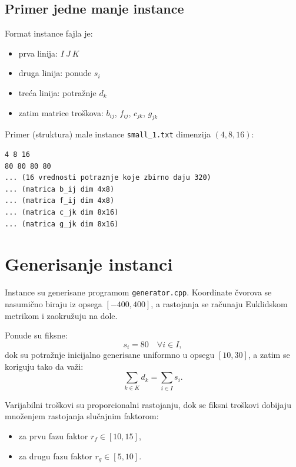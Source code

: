 \documentclass[12pt,a4paper]{article}
\begin{document}
\subsection{Primer jedne manje instance}
Format instance fajla je:
\begin{itemize}
    \item prva linija: $I\ J\ K$
    \item druga linija: ponude $s_i$
    \item treća linija: potražnje $d_k$
    \item zatim matrice troškova: $b_{ij}$, $f_{ij}$, $c_{jk}$, $g_{jk}$
\end{itemize}

Primer (struktura) male instance \texttt{small\_1.txt} dimenzija $(4,8,16)$:
\begin{verbatim}
4 8 16
80 80 80 80
... (16 vrednosti potraznje koje zbirno daju 320)
... (matrica b_ij dim 4x8)
... (matrica f_ij dim 4x8)
... (matrica c_jk dim 8x16)
... (matrica g_jk dim 8x16)
\end{verbatim}

\section{Generisanje instanci}
Instance su generisane programom \texttt{generator.cpp}. Koordinate čvorova se nasumično biraju iz opsega $[-400,400]$,
a rastojanja se računaju Euklidskom metrikom i zaokružuju na dole.

Ponude su fiksne:
\[
s_i = 80 \quad \forall i \in I,
\]
dok su potražnje inicijalno generisane uniformno u opsegu $[10,30]$, a zatim se koriguju tako da važi:
\[
\sum_{k \in K} d_k = \sum_{i \in I} s_i.
\]

Varijabilni troškovi su proporcionalni rastojanju, dok se fiksni troškovi dobijaju množenjem rastojanja slučajnim faktorom:
\begin{itemize}
    \item za prvu fazu faktor $r_f \in [10,15]$,
    \item za drugu fazu faktor $r_g \in [5,10]$.
\end{itemize}
\end{document}
